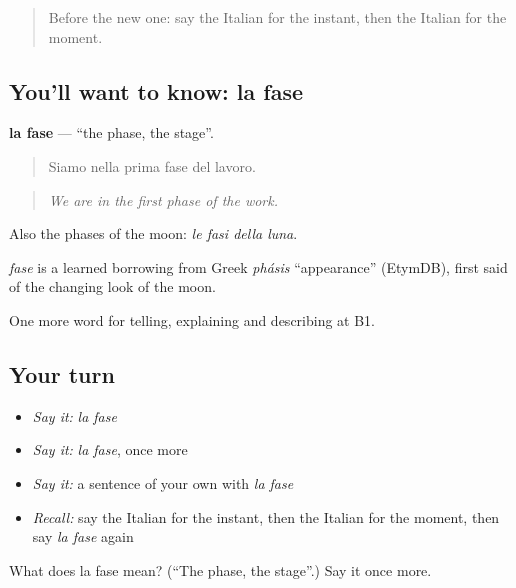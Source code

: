 \label{lesson:IT-C277-fase}



\begin{quote}
Before the new one: say the Italian for the instant, then the Italian for the moment.
\end{quote}

\subsection*{You'll want to know: la fase}
\textbf{la fase} — \textquotedblleft{}the phase, the stage\textquotedblright{}.

\begin{quote}
Siamo nella prima fase del lavoro.
\end{quote}

\begin{quote}
\emph{We are in the first phase of the work.}
\end{quote}

Also the phases of the moon: \emph{le fasi della luna}.

\begin{cousinweb}
\emph{fase} is a learned borrowing from Greek \emph{phásis} \textquotedblleft{}appearance\textquotedblright{} (EtymDB), first said of the changing look of the moon.
\end{cousinweb}

\begin{grammarlens}[title={What you've built}]
One more word for telling, explaining and describing at B1.
\end{grammarlens}

\subsection*{Your turn}
\begin{itemize}
\raggedright
  \item \emph{Say it:} \emph{la fase}
  \item \emph{Say it:} \emph{la fase}, once more
  \item \emph{Say it:} a sentence of your own with \emph{la fase}
  \item \emph{Recall:} say the Italian for the instant, then the Italian for the moment, then say \emph{la fase} again
\end{itemize}

\begin{tcolorbox}[breakable,colback=teal!4,colframe=teal!35!black,title={Before you move on}]
What does la fase mean? (\textquotedblleft{}The phase, the stage\textquotedblright{}.) Say it once more.
\end{tcolorbox}
